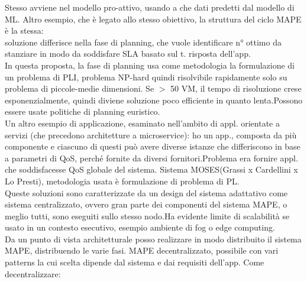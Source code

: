 \documentclass{article}
\begin{document}
Stesso avviene nel modello pro-attivo, usando a che dati predetti dal modello di ML.
Altro esempio, che è legato allo stesso obiettivo, la struttura del ciclo MAPE è la stessa:\\soluzione differisce nella fase di planning, che vuole identificare n° ottimo da stanziare in modo da soddisfare SLA basato sul t. risposta dell'app.\\In questa proposta, la fase di planning usa come metodologia la formulazione di un problema di PLI, problema NP-hard quindi risolvibile rapidamente solo su problema di piccole-medie dimensioni. Se $>$ 50 VM, il tempo di risoluzione crese esponenzialmente, quindi diviene soluzione poco efficiente in quanto lenta.Possono essere usate politiche di planning euristico.\\
Un altro esempio di applicazione, esaminato nell'ambito di appl. orientate a servizi (che precedono architetture a microservice): ho un app., composta da più componente e ciascuno di questi può avere diverse istanze che differiscono in base a parametri di QoS, perché fornite da diversi fornitori.Problema era fornire appl. che soddisfacesse QoS globale del sistema. Sistema MOSES(Grassi x Cardellini x Lo Presti), metodologia usata è formulazione di problema di PL.\\
Queste soluzioni sono caratterizzate da un design del sistema adattativo come sistema centralizzato, ovvero gran parte dei componenti del sistema MAPE, o meglio tutti, sono eseguiti sullo stesso nodo.Ha evidente limite di scalabilità se usato in un contesto esecutivo, esempio ambiente di fog o edge computing.\\
Da un punto di vista architetturale posso realizzare in modo distribuito il sistema MAPE, distribuendo le varie fasi. MAPE decentralizzato, possibile con vari patterns la cui scelta dipende dal sistema e dai requisiti dell'app.
Come decentralizzare:\\
\end{document}
